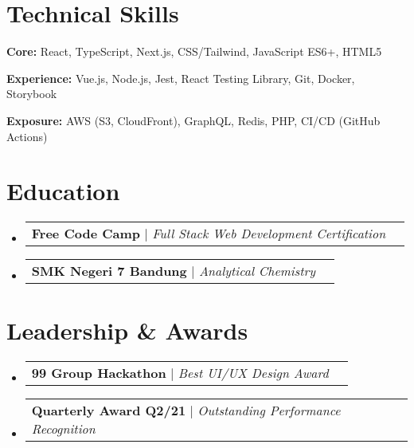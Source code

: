 \documentclass[a4paper, 11pt]{article}
\makeatletter
\newcommand{\resumeProjectHeading}[2]{
    \item
    \begin{tabular*}{0.987\textwidth}{l@{\extracolsep{\fill}}r}
      \small#1\\
    \end{tabular*}\vspace{-7pt}
}
\newcommand{\resumeSubHeadingListStart}{\begin{itemize}[leftmargin=0.1in, label={}]}
\newcommand{\resumeSubHeadingListEnd}{\end{itemize}\vspace{5pt}}
\makeatother
\begin{document}
\section{Technical Skills}
    \resumeSubHeadingListStart
        \small{
            \item \textbf{Core:} React, TypeScript, Next.js, CSS/Tailwind, JavaScript ES6+, HTML5
            \item \textbf{Experience:} Vue.js, Node.js, Jest, React Testing Library, Git, Docker, Storybook
            \item \textbf{Exposure:} AWS (S3, CloudFront), GraphQL, Redis, PHP, CI/CD (GitHub Actions)
        }
    \resumeSubHeadingListEnd

\section{Education}
    \resumeSubHeadingListStart
        \resumeProjectHeading
            {\textbf{Free Code Camp} $|$ \emph{Full Stack Web Development Certification}}{2016}
        \resumeProjectHeading
            {\textbf{SMK Negeri 7 Bandung} $|$ \emph{Analytical Chemistry}}{2009 -- 2011}
    \resumeSubHeadingListEnd

\section{Leadership \& Awards}
    \resumeSubHeadingListStart
        \resumeProjectHeading
            {\textbf{99 Group Hackathon} $|$ \emph{Best UI/UX Design Award}}{2021}
        \resumeProjectHeading
            {\textbf{Quarterly Award Q2/21} $|$ \emph{Outstanding Performance Recognition}}{2021}
    \resumeSubHeadingListEnd
\end{document}
